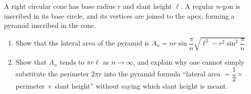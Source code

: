 A right circular cone has base radius $r$ and slant height $\ell$. A regular $n$-gon is inscribed in its base circle, and its vertices are joined to the apex, forming a pyramid inscribed in the cone.
\begin{enumerate}
\item[(a)] Show that the lateral area of the pyramid is $A_n=nr\sin\dfrac{\pi}{n}\sqrt{\ell^2-r^2\sin^2\dfrac{\pi}{n}}$.
\item[(b)] Show that $A_n$ tends to $\pi r\ell$ as $n\to\infty$, and explain why one cannot simply substitute the perimeter $2\pi r$ into the pyramid formula ``lateral area $=\dfrac{1}{2}\times$ perimeter $\times$ slant height'' without saying which slant height is meant.
\end{enumerate}
